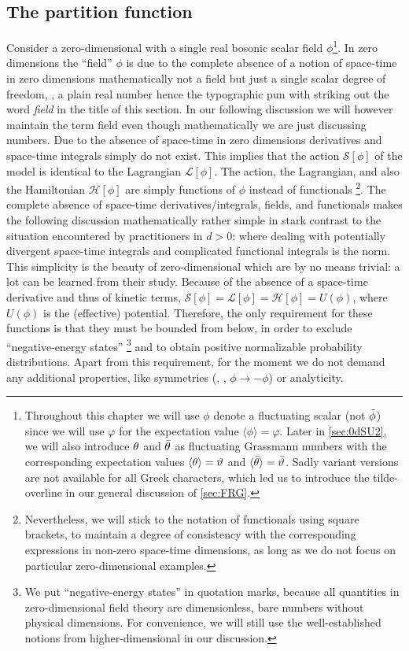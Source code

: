 \subsection{The partition function}\label{subsec:partition_function}
Consider a zero-dimensional \qft{} with a single real bosonic scalar field $\phi$\footnote{
Throughout this chapter we will use $\phi$ denote a fluctuating scalar (not $\tilde{\phi}$) since we will use $\varphi$ for the expectation value $\langle \phi\rangle=\varphi$.
Later in \cref{sec:0dSU2}, we will also introduce $\theta$ and $\bar{\theta}$ as fluctuating Grassmann numbers with the corresponding expectation values $\langle\theta\rangle=\vartheta$ and $\langle\bar{\theta}\rangle=\bar{\vartheta}$.
Sadly variant versions are not available for all Greek characters, which led us to introduce the tilde-overline in our general discussion of \cref{sec:FRG}.
}.
In zero dimensions the ``field'' $\phi$ is due to the complete absence of a notion of space-time in zero dimensions mathematically not a field but just a single scalar degree of freedom, \ie{}, a plain real number \dash{} hence the typographic pun with striking out the word \textit{field} in the title of this section.
In our following discussion we will however maintain the term field even though mathematically we are just discussing numbers.
Due to the absence of space-time in zero dimensions derivatives and space-time integrals simply do not exist.
This implies that the action $\mathcal{S}[\phi]$ of the model is identical to the Lagrangian $\mathcal{L}[\phi]$.
The action, the Lagrangian, and also the Hamiltonian $\mathcal{H}[\phi]$ are simply functions of $\phi$ instead of functionals%
\footnote{%
	Nevertheless, we will stick to the notation of functionals using square brackets, to maintain a degree of consistency with the corresponding expressions in non-zero space-time dimensions, as long as we do not focus on particular zero-dimensional examples.
}.
The complete absence of space-time derivatives/integrals, fields, and functionals makes the following discussion mathematically rather simple in stark contrast to the situation encountered by \qft{} practitioners in $d>0$: where dealing with potentially divergent space-time integrals and complicated functional integrals is the norm.
This simplicity is the beauty of zero-dimensional \qfts{} which are by no means trivial: a lot can be learned from their study.
Because of the absence of a space-time derivative and thus of kinetic terms, $\mathcal{S}[\phi] = \mathcal{L}[\phi] = \mathcal{H}[\phi] = U(\phi)$, where $U(\phi)$ is the (effective) potential.
Therefore, the only requirement for these functions is that they must be bounded from below, in order to exclude ``negative-energy states''%
\footnote{
	We put ``negative-energy states'' in quotation marks, because all quantities in zero-dimensional field theory are dimensionless, \viz{} bare numbers without physical dimensions.
	For convenience, we will still use the well-established notions from higher-dimensional \qfts{} in our discussion.
}
and to obtain positive normalizable probability distributions.
Apart from this requirement, for the moment we do not demand any additional properties, like symmetries (\eg{}, \ZII{}, $\phi \rightarrow - \phi$) or analyticity.

